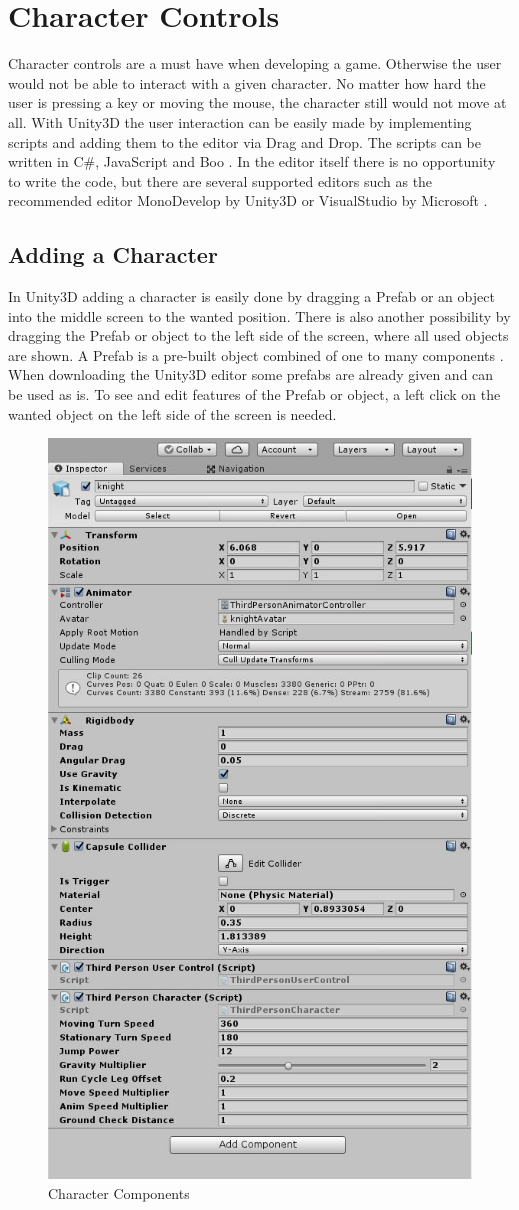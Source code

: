 \documentclass[conference]{IEEEtran}
\newcommand{\csh}{C{\#}}
\begin{document}
\section{Character Controls}

Character controls are a must have when developing a game. Otherwise the user would not be able to interact with a given character. No matter how hard the user is pressing a key or moving the mouse, the character still would not move at all.
With Unity3D the user interaction can be easily made by implementing scripts and adding them to the editor via Drag and Drop. The scripts can be written in \csh, JavaScript and Boo \cite{b1}. In the editor itself there is no opportunity to write the code, but there are several supported editors such as the recommended editor MonoDevelop by Unity3D or VisualStudio by Microsoft \cite{b1}.

\subsection{Adding a Character}

In Unity3D adding a character is easily done by dragging a Prefab or an object into the middle screen to the wanted position. There is also another possibility by dragging the Prefab or object to the left side of the screen, where all used objects are shown. A Prefab is a pre-built object combined of one to many components \cite{b2}. When downloading the Unity3D editor some prefabs are already given and can be used as is.
To see and edit features of the Prefab or object, a left click on the wanted object on the left side of the screen is needed. 

\begin{figure}[htbp]
  \includegraphics[width=.4\textwidth]{pictures/character_controls_character_components}
  \caption{Character Components}
  \label{fig:character_controls_character_components}
\end{figure}
\end{document}
